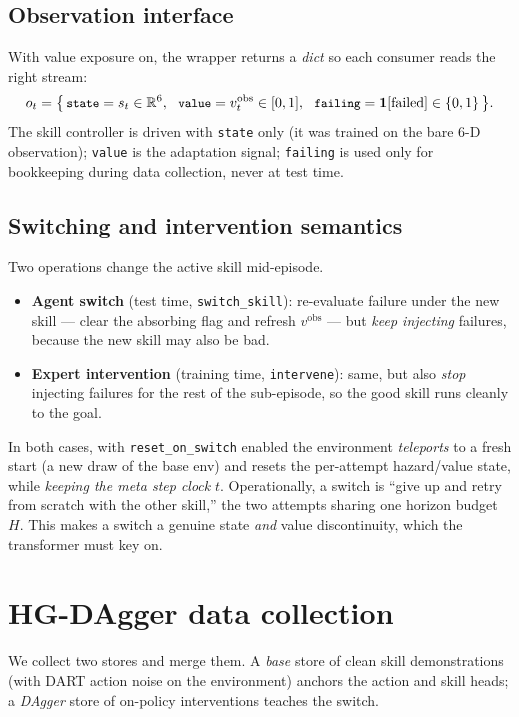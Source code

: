\documentclass[11pt]{article}
\newcommand{\R}{\mathbb{R}}
\newcommand{\st}{s}
\newcommand{\code}[1]{\texttt{\small #1}}
\begin{document}
\subsection{Observation interface}
With value exposure on, the wrapper returns a \emph{dict} so each consumer reads the
right stream:
\begin{equation}
o_t=\big\{\,\code{state}=\st_t\in\R^{6},\ \ \code{value}=v^{\mathrm{obs}}_t\in[0,1],
\ \ \code{failing}=\mathbf{1}[\text{failed}]\in\{0,1\}\,\big\}.
\end{equation}
The skill controller is driven with \code{state} only (it was trained on the bare
$6$-D observation); \code{value} is the adaptation signal; \code{failing} is used only
for bookkeeping during data collection, never at test time.

\subsection{Switching and intervention semantics}
Two operations change the active skill mid-episode.
\begin{itemize}
\item \textbf{Agent switch} (test time, \code{switch\_skill}): re-evaluate failure
under the new skill --- clear the absorbing flag and refresh $v^{\mathrm{obs}}$ ---
but \emph{keep injecting} failures, because the new skill may also be bad.
\item \textbf{Expert intervention} (training time, \code{intervene}): same, but also
\emph{stop} injecting failures for the rest of the sub-episode, so the good skill runs
cleanly to the goal.
\end{itemize}
In both cases, with \code{reset\_on\_switch} enabled the environment \emph{teleports}
to a fresh start (a new draw of the base env) and resets the per-attempt hazard/value
state, while \emph{keeping the meta step clock} $t$. Operationally, a switch is
``give up and retry from scratch with the other skill,'' the two attempts sharing one
horizon budget $H$. This makes a switch a genuine state \emph{and} value
discontinuity, which the transformer must key on.

\section{HG-DAgger data collection}
\label{sec:dagger}

We collect two stores and merge them. A \emph{base} store of clean
skill demonstrations (with DART action noise on the environment) anchors the action
and skill heads; a \emph{DAgger} store of on-policy interventions teaches the switch.
\end{document}
